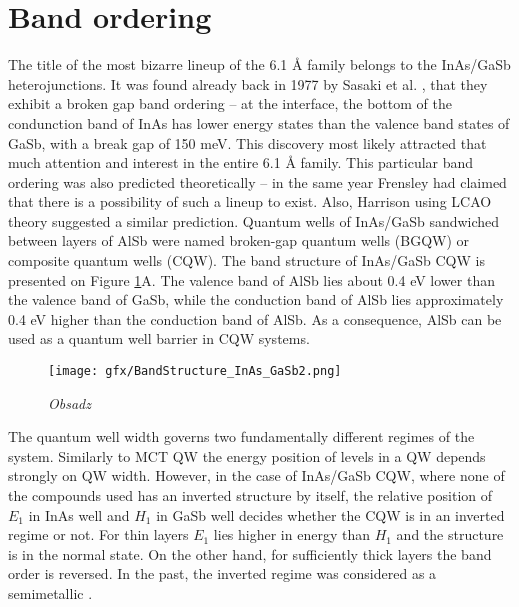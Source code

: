 \documentclass[titlepage,a4paper]{book}
\begin{document}
\section{Band ordering}
The title of the most bizarre lineup of the 6.1 Å family belongs to the InAs/GaSb heterojunctions. It was found already back in 1977 by Sasaki et al. \cite{Sasaki_BandOrdering}, that they exhibit a broken gap band ordering -- at the interface, the bottom of the condunction band of InAs has lower energy states than the valence band states of GaSb, with a break gap of 150 meV. This discovery most likely attracted that much attention and interest in the entire 6.1 Å family. This particular band ordering was also predicted theoretically -- in the same year Frensley \cite{Frensley_BandOrdering} had claimed that there is a possibility of such a lineup to exist. Also, Harrison using LCAO theory \cite{Harrison_BandOrdering} suggested a similar prediction. Quantum wells of InAs/GaSb sandwiched between layers of AlSb were named broken-gap quantum wells (BGQW) or composite quantum wells (CQW). The band structure of InAs/GaSb CQW is presented on Figure \ref{fig:BandStructure_InAs_GaSb2}A. The valence band of AlSb lies about 0.4 eV lower than the valence band of GaSb, while the conduction band of AlSb lies approximately 0.4 eV higher than the conduction band of AlSb. As a consequence, AlSb can be used as a quantum well barrier in CQW systems.

\begin{figure}[ht]
	\centering
	\texttt{[image: gfx/BandStructure\_InAs\_GaSb2.png]}
	\vspace{-10pt}
	\caption{\textit{Obsadz}}
	\label{fig:BandStructure_InAs_GaSb2}
\end{figure} 

The quantum well width governs two fundamentally different regimes of the system. Similarly to MCT QW the energy position of levels in a QW depends strongly on QW width. However, in the case of InAs/GaSb CQW, where none of the compounds used has an inverted structure by itself, the relative position of $E_1$ in InAs well and $H_1$ in GaSb well decides whether the CQW is in an inverted regime or not. For thin layers $E_1$ lies higher in energy than $H_1$ and the structure is in the normal state. On the other hand, for sufficiently thick layers the band order is reversed. In the past, the inverted regime was considered as a semimetallic \cite{Chang_BandStructure}. 
\end{document}
